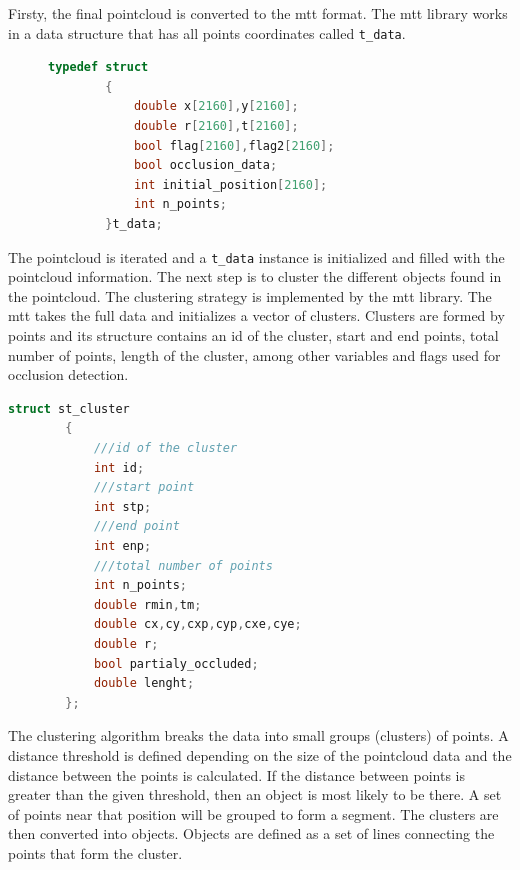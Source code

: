 Firsty, the final pointcloud is converted to the \gls{mtt} format. The \gls{mtt} library works in a data structure that has all points coordinates called \texttt{t\_data}.

\begin{figure}
	\begin{center}
		\begin{lstlisting}[label={lst:t_data}, caption={t\_data struct definition},language=c++]
		typedef struct
		{
			double x[2160],y[2160];
			double r[2160],t[2160];
			bool flag[2160],flag2[2160];
			bool occlusion_data;
			int initial_position[2160];
			int n_points;
		}t_data; 		\end{lstlisting}
	\end{center}
\end{figure}

The pointcloud is iterated and a \texttt{t\_data} instance is initialized and filled with the pointcloud information. The next step is to cluster the different objects found in the pointcloud. The clustering strategy is implemented by the \gls{mtt} library. The \gls{mtt} takes the full data and initializes a vector of clusters. Clusters are formed by points and its structure contains an id of the cluster, start and end points, total number of points, length of the cluster, among other variables and flags used for occlusion detection.

	\begin{center}
		\begin{lstlisting}[label={lst:stcluster}, caption={st\_cluster struct definition},language=c++]
		struct st_cluster
		{
			///id of the cluster
			int id;			
			///start point
			int stp;
			///end point
			int enp;	
			///total number of points
			int n_points;	
			double rmin,tm;
			double cx,cy,cxp,cyp,cxe,cye;
			double r;
			bool partialy_occluded;
			double lenght;
		};		\end{lstlisting}
	\end{center}

The clustering algorithm breaks the data into small groups (clusters) of points. A distance threshold is defined depending on the size of the pointcloud data and the distance between the points is calculated. If the distance between points is greater than the given threshold, then an object is most likely to be there. A set of points near that position will be grouped to form a segment. The clusters are then converted into objects. Objects are defined as a set of lines connecting the points that form the cluster. 

